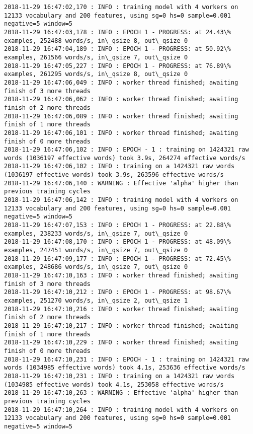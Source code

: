 \documentclass[11pt]{article}
\begin{document}
\begin{Verbatim}[commandchars=\\\{\}]
2018-11-29 16:47:02,170 : INFO : training model with 4 workers on 12133 vocabulary and 200 features, using sg=0 hs=0 sample=0.001 negative=5 window=5
2018-11-29 16:47:03,178 : INFO : EPOCH 1 - PROGRESS: at 24.43\% examples, 252488 words/s, in\_qsize 8, out\_qsize 0
2018-11-29 16:47:04,189 : INFO : EPOCH 1 - PROGRESS: at 50.92\% examples, 261566 words/s, in\_qsize 7, out\_qsize 0
2018-11-29 16:47:05,227 : INFO : EPOCH 1 - PROGRESS: at 76.89\% examples, 261295 words/s, in\_qsize 8, out\_qsize 0
2018-11-29 16:47:06,049 : INFO : worker thread finished; awaiting finish of 3 more threads
2018-11-29 16:47:06,062 : INFO : worker thread finished; awaiting finish of 2 more threads
2018-11-29 16:47:06,089 : INFO : worker thread finished; awaiting finish of 1 more threads
2018-11-29 16:47:06,101 : INFO : worker thread finished; awaiting finish of 0 more threads
2018-11-29 16:47:06,102 : INFO : EPOCH - 1 : training on 1424321 raw words (1036197 effective words) took 3.9s, 264274 effective words/s
2018-11-29 16:47:06,102 : INFO : training on a 1424321 raw words (1036197 effective words) took 3.9s, 263596 effective words/s
2018-11-29 16:47:06,140 : WARNING : Effective 'alpha' higher than previous training cycles
2018-11-29 16:47:06,142 : INFO : training model with 4 workers on 12133 vocabulary and 200 features, using sg=0 hs=0 sample=0.001 negative=5 window=5
2018-11-29 16:47:07,153 : INFO : EPOCH 1 - PROGRESS: at 22.88\% examples, 238233 words/s, in\_qsize 7, out\_qsize 0
2018-11-29 16:47:08,170 : INFO : EPOCH 1 - PROGRESS: at 48.09\% examples, 247451 words/s, in\_qsize 7, out\_qsize 0
2018-11-29 16:47:09,177 : INFO : EPOCH 1 - PROGRESS: at 72.45\% examples, 248686 words/s, in\_qsize 7, out\_qsize 0
2018-11-29 16:47:10,163 : INFO : worker thread finished; awaiting finish of 3 more threads
2018-11-29 16:47:10,212 : INFO : EPOCH 1 - PROGRESS: at 98.67\% examples, 251270 words/s, in\_qsize 2, out\_qsize 1
2018-11-29 16:47:10,216 : INFO : worker thread finished; awaiting finish of 2 more threads
2018-11-29 16:47:10,217 : INFO : worker thread finished; awaiting finish of 1 more threads
2018-11-29 16:47:10,229 : INFO : worker thread finished; awaiting finish of 0 more threads
2018-11-29 16:47:10,231 : INFO : EPOCH - 1 : training on 1424321 raw words (1034985 effective words) took 4.1s, 253636 effective words/s
2018-11-29 16:47:10,231 : INFO : training on a 1424321 raw words (1034985 effective words) took 4.1s, 253058 effective words/s
2018-11-29 16:47:10,263 : WARNING : Effective 'alpha' higher than previous training cycles
2018-11-29 16:47:10,264 : INFO : training model with 4 workers on 12133 vocabulary and 200 features, using sg=0 hs=0 sample=0.001 negative=5 window=5

\end{Verbatim}
\end{document}
